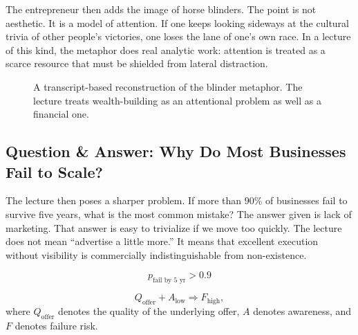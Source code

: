 The entrepreneur then adds the image of horse blinders. The point is not aesthetic. It is a model of attention. If one keeps looking sideways at the cultural trivia of other people's victories, one loses the lane of one's own race. In a lecture of this kind, the metaphor does real analytic work: attention is treated as a scarce resource that must be shielded from lateral distraction.

\begin{figure}[h]
\centering
{}
\caption{A transcript-based reconstruction of the blinder metaphor. The lecture treats wealth-building as an attentional problem as well as a financial one.}
\end{figure}

\subsection{Question \& Answer: Why Do Most Businesses Fail to Scale?}

The lecture then poses a sharper problem. If more than \(90\%\) of businesses fail to survive five years, what is the most common mistake? The answer given is lack of marketing. That answer is easy to trivialize if we move too quickly. The lecture does not mean ``advertise a little more.'' It means that excellent execution without visibility is commercially indistinguishable from non-existence.

\begin{equation}
p_{\text{fail by 5 yr}} > 0.9
\end{equation}

\begin{equation}
Q_{\text{offer}} + A_{\text{low}} \Rightarrow F_{\text{high}},
\end{equation}
where \(Q_{\text{offer}}\) denotes the quality of the underlying offer, \(A\) denotes awareness, and \(F\) denotes failure risk.

